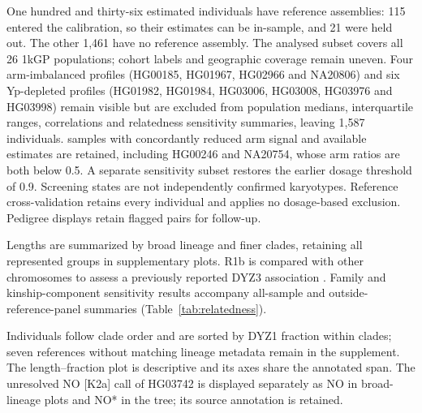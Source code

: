 One hundred and thirty-six estimated individuals have reference assemblies: 115 entered the calibration, so their estimates can be in-sample, and 21 were held out. The other 1,461 have no reference assembly. The analysed subset covers all 26 1kGP populations; cohort labels and geographic coverage remain uneven. Four arm-imbalanced profiles (HG00185, HG01967, HG02966 and NA20806) and six Yp-depleted profiles (HG01982, HG01984, HG03006, HG03008, HG03976 and HG03998) remain visible but are excluded from population medians, interquartile ranges, correlations and relatedness sensitivity summaries, leaving 1,587 individuals.   samples with concordantly reduced arm signal and available estimates are retained, including HG00246 and NA20754, whose arm ratios are both below 0.5. A separate sensitivity subset restores the earlier dosage threshold of 0.9. Screening states are not independently confirmed karyotypes. Reference cross-validation retains every individual and applies no dosage-based exclusion. Pedigree displays retain flagged pairs for follow-up.

Lengths are summarized by broad lineage and finer clades, retaining all represented groups in supplementary plots. R1b is compared with other chromosomes to assess a previously reported DYZ3 association \cite{Hallast2023}. Family and kinship-component sensitivity results accompany all-sample and outside-reference-panel summaries (Table~\ref{tab:relatedness}).


 Individuals follow clade order and are sorted by DYZ1 fraction within clades; seven references without matching lineage metadata remain in the supplement. The length--fraction plot is descriptive and its axes share the annotated span. The unresolved NO [K2a] call of HG03742 is displayed separately as NO in broad-lineage plots and NO* in the tree; its source annotation is retained.

